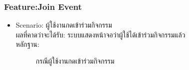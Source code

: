\documentclass[14pt,oneside,openright,a4paper]{cpe-thai-project}
\begin{document}
\subsubsection{Feature:Join Event}
\begin{itemize}
  \item Scenario: ผู้ใช้งานกดเข้าร่วมกิจกรรม
  \\ผลที่คาดว่าจะได้รับ: ระบบแสดงหน้าจอว่าผู้ใช้ได้เข้าร่วมกิจกรรมแล้ว
  \\หลักฐาน:\\
  \begin{figure}[!h]\centering
    \setlength{\fboxrule}{0.5mm} %
    \setlength{\fboxsep}{0.5cm}
    \caption{กรณีผู้ใช้งานกดเข้าร่วมกิจกรรม}\label{fig:FeedPageEventTest}
  \end{figure}
\end{itemize}

\newpage
\end{document}
